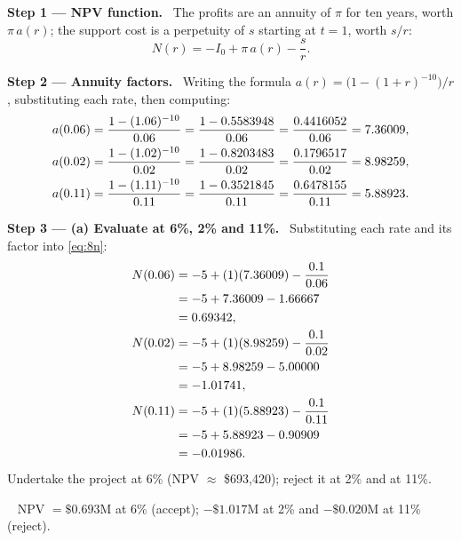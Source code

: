 \documentclass[11pt,a4paper]{article}
\numberwithin{equation}{section}
\newcommand{\step}[2]{\par\medskip\noindent\textbf{Step #1 --- #2.}~}
\newcommand{\answer}[1]{\par\smallskip\noindent\fbox{\textbf{Answer #1.}}~}
\begin{document}
\step{1}{NPV function} The profits are an annuity of $\pi$ for ten years, worth $\pi\,a(r)$; the
support cost is a perpetuity of $s$ starting at $t=1$, worth $s/r$:
\begin{equation}\label{eq:8n}
  N(r) = -I_0 + \pi\,a(r) - \frac{s}{r}.
\end{equation}

\step{2}{Annuity factors} Writing the formula $a(r)=\big(1-(1+r)^{-10}\big)/r$, substituting each
rate, then computing:
\begin{align}
  a(0.06) &= \frac{1-(1.06)^{-10}}{0.06} = \frac{1-0.5583948}{0.06} = \frac{0.4416052}{0.06} = 7.36009, \notag\\
  a(0.02) &= \frac{1-(1.02)^{-10}}{0.02} = \frac{1-0.8203483}{0.02} = \frac{0.1796517}{0.02} = 8.98259, \notag\\
  a(0.11) &= \frac{1-(1.11)^{-10}}{0.11} = \frac{1-0.3521845}{0.11} = \frac{0.6478155}{0.11} = 5.88923. \notag
\end{align}

\step{3}{(a) Evaluate at 6\%, 2\% and 11\%} Substituting each rate and its factor into \eqref{eq:8n}:
\begin{align}
  N(0.06) &= -5 + (1)(7.36009) - \frac{0.1}{0.06} \notag\\
          &= -5 + 7.36009 - 1.66667 \notag\\
          &= 0.69342, \label{eq:8n6}\\
  N(0.02) &= -5 + (1)(8.98259) - \frac{0.1}{0.02} \notag\\
          &= -5 + 8.98259 - 5.00000 \notag\\
          &= -1.01741, \label{eq:8n2}\\
  N(0.11) &= -5 + (1)(5.88923) - \frac{0.1}{0.11} \notag\\
          &= -5 + 5.88923 - 0.90909 \notag\\
          &= -0.01986. \label{eq:8n11}
\end{align}
Undertake the project at 6\% (NPV $\approx$ \$693{,}420); reject it at 2\% and at 11\%.

\answer{(a)} NPV $=\$0.693$M at 6\% (accept); $-\$1.017$M at 2\% and $-\$0.020$M at 11\% (reject).
\end{document}
